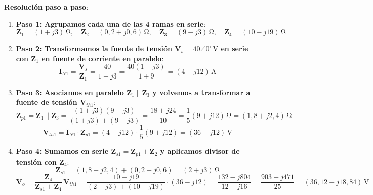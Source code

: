 \begin{ejercicio}
\textbf{Resolución paso a paso}:
\begin{enumerate}
    \item \textbf{Paso 1: Agrupamos cada una de las 4 ramas en serie}:
    \begin{equation*}
        \mathbf{Z}_1 = (1 + j 3)\,\si{\ohm}, \quad \mathbf{Z}_2 = (0{,}2 + j 0{,}6)\,\si{\ohm}, \quad \mathbf{Z}_3 = (9 - j 3)\,\si{\ohm}, \quad \mathbf{Z}_4 = (10 - j 19)\,\si{\ohm}
    \end{equation*}
    \item \textbf{Paso 2: Transformamos la fuente de tensión $\mathbf{V}_s = 40\angle 0^\circ\,\si{\volt}$ en serie con $\mathbf{Z}_1$ en fuente de corriente en paralelo}:
    \begin{equation*}
        \mathbf{I}_{N1} = \frac{\mathbf{V}_s}{\mathbf{Z}_1} = \frac{40}{1 + j 3} = \frac{40(1 - j 3)}{1 + 9} = (4 - j 12)\,\si{\ampere}
    \end{equation*}
    \item \textbf{Paso 3: Asociamos en paralelo $\mathbf{Z}_1 \parallel \mathbf{Z}_3$ y volvemos a transformar a fuente de tensión $\mathbf{V}_{th1}$}:
    \begin{equation*}
        \mathbf{Z}_{p1} = \mathbf{Z}_1 \parallel \mathbf{Z}_3 = \frac{(1 + j 3)(9 - j 3)}{(1 + j 3) + (9 - j 3)} = \frac{18 + j 24}{10} = \frac{1}{5}(9 + j 12)\,\si{\ohm} = (1{,}8 + j 2{,}4)\,\si{\ohm}
    \end{equation*}
    \begin{equation*}
        \mathbf{V}_{th1} = \mathbf{I}_{N1} \cdot \mathbf{Z}_{p1} = (4 - j 12)\cdot\frac{1}{5}(9 + j 12) = (36 - j 12)\,\si{\volt}
    \end{equation*}
    \item \textbf{Paso 4: Sumamos en serie $\mathbf{Z}_{s1} = \mathbf{Z}_{p1} + \mathbf{Z}_2$ y aplicamos divisor de tensión con $\mathbf{Z}_4$}:
    \begin{equation*}
        \mathbf{Z}_{s1} = (1{,}8 + j 2{,}4) + (0{,}2 + j 0{,}6) = (2 + j 3)\,\si{\ohm}
    \end{equation*}
    \begin{equation*}
        \mathbf{V}_o = \frac{\mathbf{Z}_4}{\mathbf{Z}_{s1} + \mathbf{Z}_4}\,\mathbf{V}_{th1} = \frac{10 - j 19}{(2 + j 3) + (10 - j 19)}\cdot(36 - j 12) = \frac{132 - j 804}{12 - j 16} = \frac{903 - j 471}{25} = \boxed{(36{,}12 - j 18{,}84)\,\si{\volt}}
    \end{equation*}
\end{enumerate}
\end{ejercicio}

